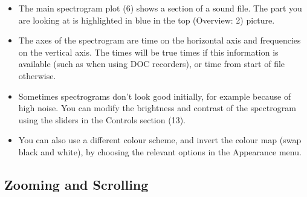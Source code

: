 \documentclass{article}
\begin{document}
\begin{itemize}
\item The main spectrogram plot (6) shows a section of a sound file. The part you are looking at is highlighted in blue in the top (Overview: 2) picture.

\item The axes of the spectrogram are time on the horizontal axis and frequencies on the vertical axis. The times will be true times if this information is available (such as when using DOC recorders), or time from start of file otherwise. 

\item Sometimes spectrograms don't look good initially, for example because of high noise. You can modify the brightness and contrast of the spectrogram using the sliders in the Controls section (13). 
\item You can also use a different colour scheme, and invert the colour map (swap black and white), by choosing the relevant options in the Appearance menu.
\end{itemize}

\subsection{Zooming and Scrolling}
\end{document}
